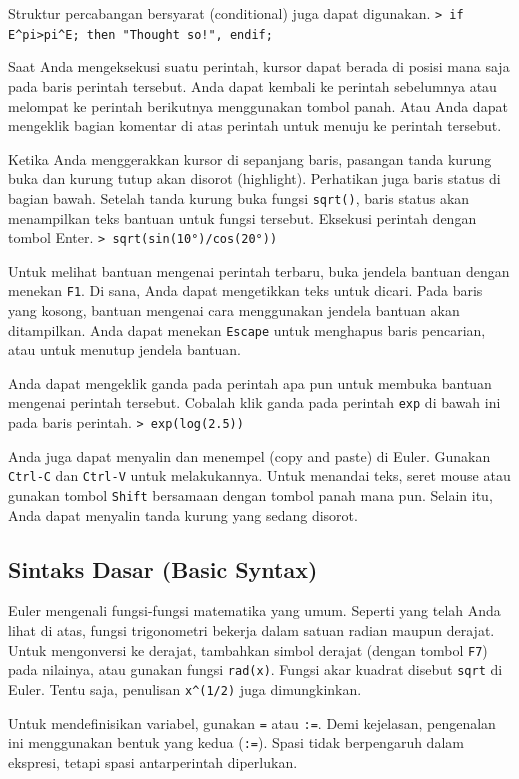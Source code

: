 \documentclass[11pt, a4paper]{article}
\newcommand{\emtcmd}[1]{\noindent\texttt{\textcolor{emtcommand}{>}\ #1}\par\smallskip}
\begin{document}
Struktur percabangan bersyarat (conditional) juga dapat digunakan.
\emtcmd{if E\^{}pi>pi\^{}E; then "Thought so!", endif;}

Saat Anda mengeksekusi suatu perintah, kursor dapat berada di posisi mana saja pada baris perintah tersebut. Anda dapat kembali ke perintah sebelumnya atau melompat ke perintah berikutnya menggunakan tombol panah. Atau Anda dapat mengeklik bagian komentar di atas perintah untuk menuju ke perintah tersebut.

Ketika Anda menggerakkan kursor di sepanjang baris, pasangan tanda kurung buka dan kurung tutup akan disorot (highlight). Perhatikan juga baris status di bagian bawah. Setelah tanda kurung buka fungsi \texttt{sqrt()}, baris status akan menampilkan teks bantuan untuk fungsi tersebut. Eksekusi perintah dengan tombol Enter.
\emtcmd{sqrt(sin(10°)/cos(20°))}

Untuk melihat bantuan mengenai perintah terbaru, buka jendela bantuan dengan menekan \texttt{F1}. Di sana, Anda dapat mengetikkan teks untuk dicari. Pada baris yang kosong, bantuan mengenai cara menggunakan jendela bantuan akan ditampilkan. Anda dapat menekan \texttt{Escape} untuk menghapus baris pencarian, atau untuk menutup jendela bantuan.

Anda dapat mengeklik ganda pada perintah apa pun untuk membuka bantuan mengenai perintah tersebut. Cobalah klik ganda pada perintah \texttt{exp} di bawah ini pada baris perintah.
\emtcmd{exp(log(2.5))}

Anda juga dapat menyalin dan menempel (copy and paste) di Euler. Gunakan \texttt{Ctrl-C} dan \texttt{Ctrl-V} untuk melakukannya. Untuk menandai teks, seret mouse atau gunakan tombol \texttt{Shift} bersamaan dengan tombol panah mana pun. Selain itu, Anda dapat menyalin tanda kurung yang sedang disorot.

\subsection*{Sintaks Dasar (Basic Syntax)}

Euler mengenali fungsi-fungsi matematika yang umum. Seperti yang telah Anda lihat di atas, fungsi trigonometri bekerja dalam satuan radian maupun derajat. Untuk mengonversi ke derajat, tambahkan simbol derajat (dengan tombol \texttt{F7}) pada nilainya, atau gunakan fungsi \texttt{rad(x)}. Fungsi akar kuadrat disebut \texttt{sqrt} di Euler. Tentu saja, penulisan \texttt{x\^{}(1/2)} juga dimungkinkan.

Untuk mendefinisikan variabel, gunakan \texttt{=} atau \texttt{:=}. Demi kejelasan, pengenalan ini menggunakan bentuk yang kedua (\texttt{:=}). Spasi tidak berpengaruh dalam ekspresi, tetapi spasi antarperintah diperlukan.
\end{document}
